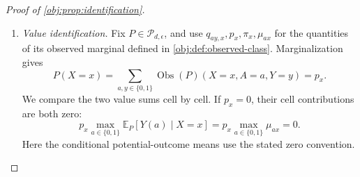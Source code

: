 \documentclass[11pt]{article}
\begin{document}
\begin{proof}[Proof of \cref{obj:prop:identification}]
\begin{enumerate}
Summing over the observed outcome, and then using the observed-atom factorization supplied by \cref{obj:def:observed-class}, yields
\[
\begin{aligned}
&P(X=x,A=a,Y(0)=y_0,Y(1)=y_1)\\
&\quad=q_{a\,y_a,x}\operatorname{Bern}(\mu_{1-a,x};y_{1-a})\\
&\quad=p_x\operatorname{Bern}(\pi_x;a)
\operatorname{Bern}(\mu_{0x};y_0)
\operatorname{Bern}(\mu_{1x};y_1).
\end{aligned}
\]
Consequently, summing these factors over the remaining binary coordinates gives, for \(a,a',y\in\{0,1\}\),
\[
\begin{aligned}
P(X=x)&=p_x,\\
P(X=x,A=a')&=p_x\operatorname{Bern}(\pi_x;a'),\\
P(X=x,Y(a)=y)&=p_x\operatorname{Bern}(\mu_{ax};y),\\
P(X=x,A=a',Y(a)=y)
&=p_x\operatorname{Bern}(\pi_x;a')
\operatorname{Bern}(\mu_{ax};y).
\end{aligned}
\]
Multiplication therefore gives
\[
\begin{aligned}
&P(X=x,A=a',Y(a)=y)\,P(X=x)\\
&\qquad=P(X=x,A=a')\,P(X=x,Y(a)=y).
\end{aligned}
\]
On positive-mass cells, division by \(p_x^2\) proves \cref{obj:ass:conditional-exchangeability}; on null cells both products are zero.

For each observed atom, the construction also gives
\[
\begin{aligned}
P(X=x,A=a,Y=y)
&=q_{ay,x}
\bigl\{
\operatorname{Bern}(\mu_{1-a,x};0)
+\operatorname{Bern}(\mu_{1-a,x};1)
\bigr\}\\
&=q_{ay,x}.
\end{aligned}
\]
Hence
\[
\operatorname{Obs}(P)=\mathbb P.
\]
The observed marginal inherits the overlap restriction of \(\mathbb P\). Together with consistency and conditional exchangeability, this puts \(P\) in the class of \cref{obj:def:causal-class}, proving the completion assertion.

\item \emph{Value identification.}
Fix \(P\in\mathcal P_{d,\epsilon}\), and use \(q_{ay,x},p_x,\pi_x,\mu_{ax}\) for the quantities of its observed marginal defined in \cref{obj:def:observed-class}. Marginalization gives
\[
P(X=x)
=\sum_{a,y\in\{0,1\}}
\operatorname{Obs}(P)(X=x,A=a,Y=y)
=p_x.
\]
We compare the two value sums cell by cell. If \(p_x=0\), their cell contributions are both zero:
\[
p_x\max_{a\in\{0,1\}}\mathbb E_P[Y(a)\mid X=x]
=
p_x\max_{a\in\{0,1\}}\mu_{ax}
=0.
\]
Here the conditional potential-outcome means use the stated zero convention.


\end{enumerate}
\end{proof}
\end{document}
